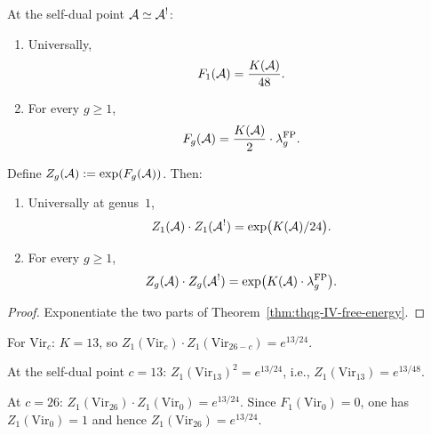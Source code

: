 \begin{corollary}
\label{cor:thqg-IV-self-dual-generating}
At the self-dual point $\mathcal{A} \simeq \mathcal{A}^!$:
\begin{enumerate}[label=\textup{(\alph*)}]
\item Universally,
\[
 F_1(\mathcal{A}) = \frac{K(\mathcal{A})}{48}.
\]
\item For every $g \geq 1$,
\[
 F_g(\mathcal{A}) = \frac{K(\mathcal{A})}{2} \cdot \lambda_g^{\mathrm{FP}}.
\]
\end{enumerate}
\end{corollary}

\begin{proposition}
\label{prop:thqg-IV-partition-duality}
Define $Z_g(\mathcal{A}) := \exp(F_g(\mathcal{A}))$. Then:
\begin{enumerate}[label=\textup{(\alph*)}]
\item Universally at genus~$1$,
\begin{equation}\label{eq:thqg-IV-partition-functional}
Z_1(\mathcal{A}) \cdot Z_1(\mathcal{A}^!)
= \exp\bigl(K(\mathcal{A})/24\bigr).
\end{equation}
\item For every $g \geq 1$,
\begin{equation}\label{eq:thqg-IV-partition-functional-uniform}
Z_g(\mathcal{A}) \cdot Z_g(\mathcal{A}^!)
= \exp\bigl(K(\mathcal{A}) \cdot \lambda_g^{\mathrm{FP}}\bigr).
\end{equation}
\end{enumerate}
\end{proposition}

\begin{proof}
Exponentiate the two parts of
Theorem~\ref{thm:thqg-IV-free-energy}.
\end{proof}

\begin{computation}
\label{comp:thqg-IV-virasoro-functional}
For $\mathrm{Vir}_c$: $K = 13$, so
$Z_1(\mathrm{Vir}_c) \cdot Z_1(\mathrm{Vir}_{26-c})
= e^{13/24}$.

At the self-dual point $c = 13$:
$Z_1(\mathrm{Vir}_{13})^2 = e^{13/24}$,
i.e., $Z_1(\mathrm{Vir}_{13}) = e^{13/48}$.

At $c = 26$:
$Z_1(\mathrm{Vir}_{26}) \cdot Z_1(\mathrm{Vir}_0) = e^{13/24}$.
Since $F_1(\mathrm{Vir}_0) = 0$, one has
$Z_1(\mathrm{Vir}_0) = 1$ and hence
$Z_1(\mathrm{Vir}_{26}) = e^{13/24}$.
\end{computation}

